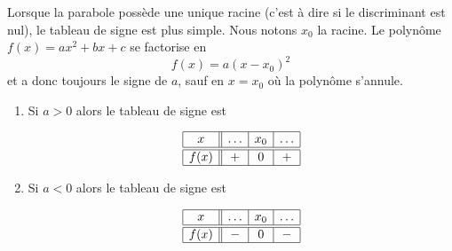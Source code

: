 Lorsque la parabole possède une unique racine (c'est à dire si le discriminant est nul), le tableau de signe est plus simple. Nous notons \( x_0\) la racine. Le polynôme \( f(x)=ax^2+bx+c\) se factorise en
\begin{equation}
    f(x)=a(x-x_0)^2
\end{equation}
et a donc toujours le signe de \( a\), sauf en \( x=x_0\) où la polynôme s'annule.

\begin{Aretenir}
\begin{enumerate}
    \item
        Si \( a>0\) alors le tableau de signe est
        \begin{multicols}{2}

            \begin{equation*}
                \begin{array}[h]{|c||c|c|c|}
                    \hline
                    x&\ldots&x_0&\ldots\\
                    \hline\hline
                    f(x)&+&0&+\\
                    \hline
                \end{array}
            \end{equation*}
            
            \columnbreak



        \end{multicols}
    \item
        Si \( a<0\) alors le tableau de signe est
        \begin{multicols}{2}

            \begin{equation*}
                \begin{array}[h]{|c||c|c|c|}
                    \hline
                    x&\ldots&x_0&\ldots\\
                    \hline\hline
                    f(x)&-&0&-\\
                    \hline
                \end{array}
            \end{equation*}
            
            \columnbreak


        \end{multicols}
        
\end{enumerate}
\end{Aretenir}

